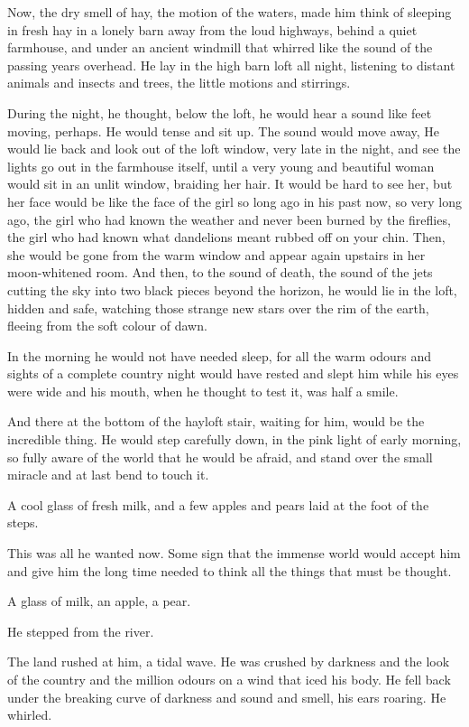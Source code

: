 \documentclass[11pt,openany]{book}
\begin{document}
Now, the dry smell of hay, the motion of the waters, made him think of sleeping in fresh hay in a lonely barn away from the loud highways, behind a quiet farmhouse, and under an ancient windmill that whirred like the sound of the passing years overhead. He lay in the high barn loft all night, listening to distant animals and insects and trees, the little motions and stirrings.

During the night, he thought, below the loft, he would hear a sound like feet moving, perhaps. He would tense and sit up. The sound would move away, He would lie back and look out of the loft window, very late in the night, and see the lights go out in the farmhouse itself, until a very young and beautiful woman would sit in an unlit window, braiding her hair. It would be hard to see her, but her face would be like the face of the girl so long ago in his past now, so very long ago, the girl who had known the weather and never been burned by the fireflies, the girl who had known what dandelions meant rubbed off on your chin. Then, she would be gone from the warm window and appear again upstairs in her moon-whitened room. And then, to the sound of death, the sound of the jets cutting the sky into two black pieces beyond the horizon, he would lie in the loft, hidden and safe, watching those strange new stars over the rim of the earth, fleeing from the soft colour of dawn.

In the morning he would not have needed sleep, for all the warm odours and sights of a complete country night would have rested and slept him while his eyes were wide and his mouth, when he thought to test it, was half a smile.

And there at the bottom of the hayloft stair, waiting for him, would be the incredible thing. He would step carefully down, in the pink light of early morning, so fully aware of the world that he would be afraid, and stand over the small miracle and at last bend to touch it.

A cool glass of fresh milk, and a few apples and pears laid at the foot of the steps.

This was all he wanted now. Some sign that the immense world would accept him and give him the long time needed to think all the things that must be thought.

A glass of milk, an apple, a pear.

He stepped from the river.

The land rushed at him, a tidal wave. He was crushed by darkness and the look of the country and the million odours on a wind that iced his body. He fell back under the breaking curve of darkness and sound and smell, his ears roaring. He whirled.
\end{document}
